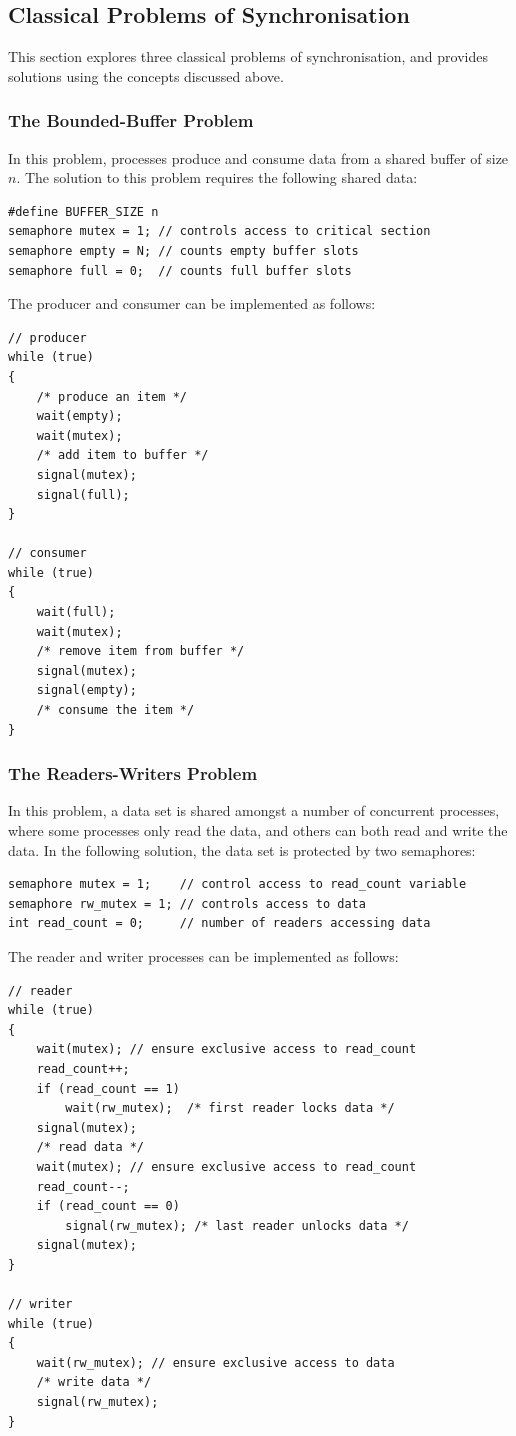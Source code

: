 \documentclass{article}
\begin{document}
\subsection{Classical Problems of Synchronisation}
This section explores three classical problems of synchronisation, and
provides solutions using the concepts discussed above.
\subsubsection{The Bounded-Buffer Problem}
In this problem, processes produce and consume data from a shared
buffer of size \(n\). The solution to this problem requires the
following shared data:
\begin{verbatim}
#define BUFFER_SIZE n
semaphore mutex = 1; // controls access to critical section
semaphore empty = N; // counts empty buffer slots
semaphore full = 0;  // counts full buffer slots
\end{verbatim}
The producer and consumer can be implemented as follows:
\begin{verbatim}
// producer
while (true)
{
    /* produce an item */
    wait(empty);
    wait(mutex);
    /* add item to buffer */
    signal(mutex);
    signal(full);
}

// consumer
while (true)
{
    wait(full);
    wait(mutex);
    /* remove item from buffer */
    signal(mutex);
    signal(empty);
    /* consume the item */
}
\end{verbatim}
\subsubsection{The Readers-Writers Problem}
In this problem, a data set is shared amongst a number of concurrent
processes, where some processes only read the data, and others can both
read and write the data. In the following solution, the data set is
protected by two semaphores:
\begin{verbatim}
semaphore mutex = 1;    // control access to read_count variable
semaphore rw_mutex = 1; // controls access to data
int read_count = 0;     // number of readers accessing data
\end{verbatim}
The reader and writer processes can be implemented as follows:
\begin{verbatim}
// reader
while (true)
{
    wait(mutex); // ensure exclusive access to read_count
    read_count++;
    if (read_count == 1)
        wait(rw_mutex);  /* first reader locks data */
    signal(mutex);
    /* read data */
    wait(mutex); // ensure exclusive access to read_count
    read_count--;
    if (read_count == 0)
        signal(rw_mutex); /* last reader unlocks data */
    signal(mutex);
}

// writer
while (true)
{
    wait(rw_mutex); // ensure exclusive access to data
    /* write data */
    signal(rw_mutex);
}
\end{verbatim}
\end{document}
